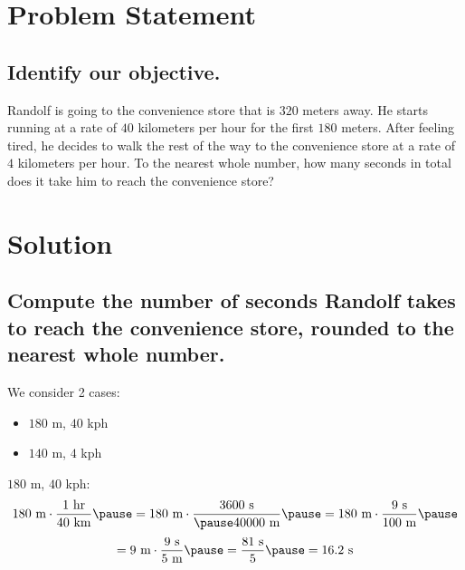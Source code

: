 \documentclass{beamer} %
\begin{document}
\begin{frame} %
  \titlepage
\end{frame}

\section{Problem Statement}

\subsection*{Identify our objective.}

\begin{frame}
  Randolf is going to the convenience store that is $320$ meters away. He starts running at a rate of $40$ kilometers per hour for the first $180$ meters. After feeling tired, he decides to walk the rest of the way to the convenience store at a rate of $4$ kilometers per hour. To the nearest whole number, how many seconds in total does it take him to reach the convenience store?
\end{frame}

\section{Solution}

\subsection*{Compute the number of seconds Randolf takes to reach the convenience store, rounded to the nearest whole number.}

\begin{frame}
  We consider 2 cases:\pause
  \begin{itemize}
  \item $180$ m, $40$ kph\pause
  \item $140$ m, $4$ kph
  \end{itemize}
\end{frame}

\begin{frame}
$180$ m, $40$ kph:
\pause
\[
180 \text{ m} \cdot \frac{1 \text{ hr}}{40 \text{ km}} \pause = 180 \text{ m} \cdot \frac{3600 \text{ s}}{\pause 40000 \text{ m}} \pause = 180 \text{ m} \cdot \frac{9 \text{ s}}{100 \text{ m}} \pause
\]
\[
= 9 \text{ m} \cdot \frac{9 \text{ s}}{5 \text{ m}} \pause = \frac{81 \text{ s}}{5} \pause = 16.2 \text{ s}
\]
\end{frame}
\begin{comment}
\[
18 \cdot \cancel{10 \text{ m}} \cdot \frac{36 \cdot \cancel{100} \text{ s}}{40 \cdot \cancel{10} \cdot \cancel{100 \text{ m}}}
\]
\end{comment}
\end{document}
